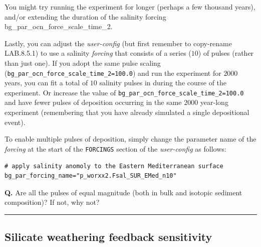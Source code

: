 You might try running the experiment for longer (perhaps a few thousand years), and/or extending the duration of the salinity forcing \textsf{\footnotesize bg\_par\_ocn\_force\_scale\_time\_2}.

\newpage

\noindent Lastly, you can adjust the \textit{user-config} (but first remember to copy-rename \textsf{\footnotesize LAB.8.5.1}) to use a salinity \textit{forcing} that consists of a series ($10$) of pulses (rather than just one). If you adopt the same pulse scaling (\texttt{\small bg\_par\_ocn\_force\_scale\_time\_2=100.0}) and run the experiment for $2000$ years, you can fit a total of $10$ salinity pulses in during the course of the experiment. Or increase the value of \texttt{\small bg\_par\_ocn\_force\_scale\_time\_2=100.0} and have fewer pulses of deposition occurring in the same $2000$ year-long experiment (remembering that you have already simulated a single depositional event).

To enable multiple pulses of deposition, simply change the parameter name of the \textit{forcing} at the start of the \texttt{\small FORCINGS} section of the \textit{user-config} as follows:

\vspace{-2mm}\small\begin{verbatim}
# apply salinity anomoly to the Eastern Mediterranean surface
bg_par_forcing_name="p_worxx2.Fsal_SUR_EMed_n10"
\end{verbatim}\normalsize\vspace{-2mm}

\vspace{1mm}
\noindent \textbf{Q.} Are all the pulses of equal magnitude (both in bulk and isotopic sediment composition)? If not, why not?

\vspace{1mm}\noindent\rule{4cm}{0.1mm}\vspace{2mm}

\newpage

\subsection{Silicate weathering feedback sensitivity}

